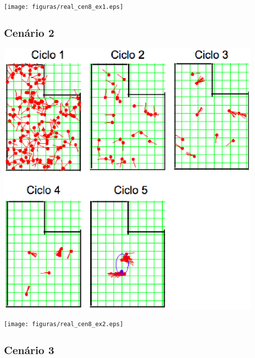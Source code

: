 {\centering
\texttt{[image: figuras/real\_cen8\_ex1.eps]}
\label{img:real_cen8_ex1}
\par}

\subsection{Cenário 2}

{\centering
\includegraphics[scale=0.4]{figuras/cen8_ex2.eps}
\label{img:cen8_ex2}
\par}

{\centering
\texttt{[image: figuras/real\_cen8\_ex2.eps]}
\label{img:real_cen8_ex2}
\par}

\subsection{Cenário 3}

